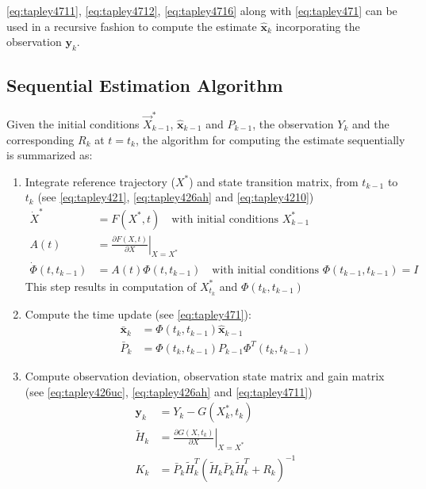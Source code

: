 \ref{eq:tapley4711}, \ref{eq:tapley4712}, \ref{eq:tapley4716} along with \ref{eq:tapley471} can be used in a recursive fashion to compute the estimate \(\hat{\bm{x}}_k\) 
incorporating the observation \(\bm{y}_k\).

\subsection{Sequential Estimation Algorithm}
\label{ssec:sequential-estimation-algorithm}
Given the initial conditions \(\vec{X}^*_{k-1}\), \(\hat{\bm{x}}_{k-1}\) and \(P_{k-1}\), 
the observation \(Y_k\) and the corresponding \(R_k\) at \(t=t_k\), the algorithm 
for computing the estimate sequentially is summarized as:
\begin{enumerate}
  \item \label{en:kalman-wf-item1} Integrate reference trajectory (\(X^*\)) and 
  state transition matrix, from \(t_{k-1}\) to \(t_k\) (see \ref{eq:tapley421}, \ref{eq:tapley426ah} and \ref{eq:tapley4210})
    \begin{subequations}
    \begin{align}
      \dot{X}^* &= F( X^* , t ) 
        \quad \text{with initial conditions } X^*_{k-1} \label{eq:tapley4717a} \\
      A(t) &= 
        \left.\frac{\partial F(X,t)}{\partial X}\right|_{X=X^*} \\
      \dot{\Phi} (t, t_{k-1}) &= 
        A(t) \Phi (t,t_{k-1}) 
        \quad \text{with initial conditions } \Phi(t_{k-1}, t_{k-1}) = I\label{eq:tapley4717b}
    \end{align}
    \end{subequations}
    This step results in computation of \(X^*_{t_k}\) and \(\Phi (t_k, t_{k-1})\)

  \item \label{en:kalman-wf-time-update} Compute the time update (see \ref{eq:tapley471}):
    \begin{subequations}
    \begin{align}
      \bar{\bm{x}}_k &= \Phi (t_k , t_{k-1}) \hat{\bm{x}}_{k-1} \\
      \bar{P}_k &= \Phi (t_k , t_{k-1}) P_{k-1} \Phi ^T (t_k , t_{k-1})
    \end{align}
    \end{subequations}

  \item Compute observation deviation, observation state matrix and gain matrix (see \ref{eq:tapley426uc}, \ref{eq:tapley426ah} and \ref{eq:tapley4711})
    \begin{subequations}
    \begin{align}
      \bm{y}_k &= Y_k - G(X^*_k , t_k ) \\
      \tilde{H}_k &= \left.\frac{\partial G(X , t_k )}{\partial X} \right|_{X=X^*} \\
      K_k & = 
        \bar{P}_k \tilde{H}^T_k 
          \left( \tilde{H}_k \bar{P}_k \tilde{H}^T_k + R_k \right) ^{-1}
    \end{align}
    \end{subequations}


\end{enumerate}
